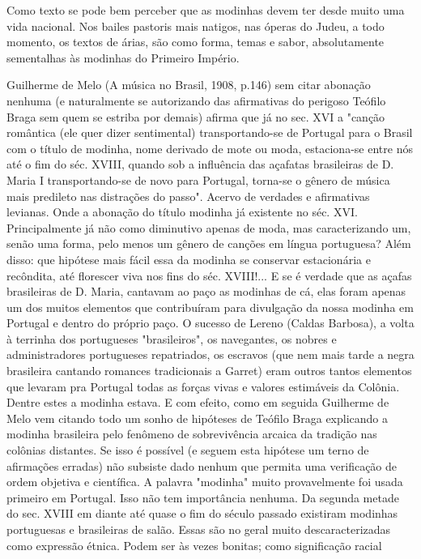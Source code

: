 Como texto se pode bem perceber que as modinhas devem ter desde muito
uma vida nacional. Nos bailes pastoris mais natigos, nas óperas do
Judeu, a todo momento, os textos de árias, são como forma, temas e
sabor, absolutamente sementalhas às modinhas do Primeiro Império.

Guilherme de Melo (A música no Brasil, 1908, p.146) sem citar abonação
nenhuma (e naturalmente se autorizando das afirmativas do perigoso
Teófilo Braga sem quem se estriba por demais) afirma que já no sec. XVI
a "canção romântica (ele quer dizer sentimental) transportando-se de
Portugal para o Brasil com o título de modinha, nome derivado de mote ou
moda, estaciona-se entre nós até o fim do séc. XVIII, quando sob a
influência das açafatas brasileiras de D. Maria I transportando-se de
novo para Portugal, torna-se o gênero de música mais predileto nas
distrações do passo". Acervo de verdades e afirmativas levianas. Onde a
abonação do título modinha já existente no séc. XVI. Principalmente já
não como diminutivo apenas de moda, mas caracterizando um, senão uma
forma, pelo menos um gênero de canções em língua portuguesa? Além disso:
que hipótese mais fácil essa da modinha se conservar estacionária e
recôndita, até florescer viva nos fins do séc. XVIII!... E se é verdade
que as açafas brasileiras de D. Maria, cantavam ao paço as modinhas de
cá, elas foram apenas um dos muitos elementos que contribuíram para
divulgação da nossa modinha em Portugal e dentro do próprio paço. O
sucesso de Lereno (Caldas Barbosa), a volta à terrinha dos portugueses
"brasileiros", os navegantes, os nobres e administradores portugueses
repatriados, os escravos (que nem mais tarde a negra brasileira cantando
romances tradicionais a Garret) eram outros tantos elementos que levaram
pra Portugal todas as forças vivas e valores estimáveis da Colônia.
Dentre estes a modinha estava. E com efeito, como em seguida Guilherme
de Melo vem citando todo um sonho de hipóteses de Teófilo Braga
explicando a modinha brasileira pelo fenômeno de sobrevivência arcaica
da tradição nas colônias distantes. Se isso é possível (e seguem esta
hipótese um terno de afirmações erradas) não subsiste dado nenhum que
permita uma verificação de ordem objetiva e científica. A palavra
"modinha" muito provavelmente foi usada primeiro em Portugal. Isso não
tem importância nenhuma. Da segunda metade do sec. XVIII em diante até
quase o fim do século passado existiram modinhas portuguesas e
brasileiras de salão. Essas são no geral muito descaracterizadas como
expressão étnica. Podem ser às vezes bonitas; como significação racial
